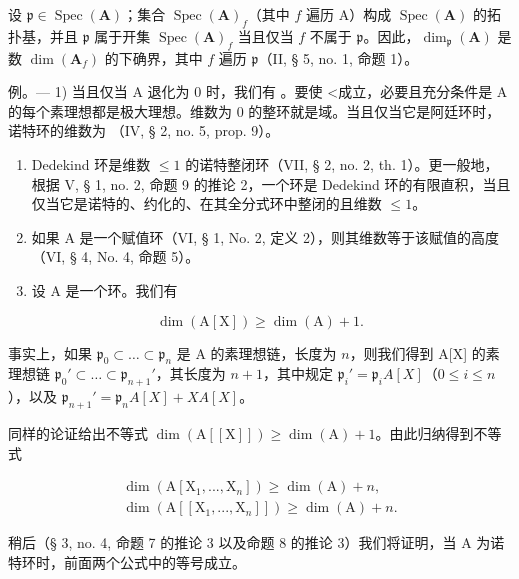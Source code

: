 设 \(\mathfrak{p} \in \operatorname{Spec}(\mathbf{A})\)；集合 \(\operatorname{Spec}(\mathbf{A})_f\)（其中 \(f\) 遍历 A）构成 \(\operatorname{Spec}(\mathbf{A})\) 的拓扑基，并且 \(\mathfrak{p}\) 属于开集 \(\operatorname{Spec}(\mathbf{A})_f\) 当且仅当 \(f\) 不属于 \(\mathfrak{p}\)。因此，\(\dim_{\mathfrak{p}}(\mathbf{A})\) 是数 \(\dim(\mathbf{A}_f)\) 的下确界，其中 \(f\) 遍历 \(\mathfrak{p}\)（II, § 5, no. 1, 命题 1）。

例。--- 1) 当且仅当 A 退化为 0 时，我们有  。要使 \textless 成立，必要且充分条件是 A 的每个素理想都是极大理想。维数为 0 的整环就是域。当且仅当它是阿廷环时，诺特环的维数为 {}（IV, § 2, no. 5, prop. 9）。

\begin{enumerate}
\def\labelenumi{\arabic{enumi})}
\setcounter{enumi}{1}
\item
Dedekind 环是维数 \(\leqslant 1\) 的诺特整闭环（VII, § 2, no. 2, th. 1）。更一般地，根据 V, § 1, no. 2, 命题 9 的推论 2，一个环是 Dedekind 环的有限直积，当且仅当它是诺特的、约化的、在其全分式环中整闭的且维数 \(\leqslant 1\)。
\item
如果 A 是一个赋值环（VI, § 1, No. 2, 定义 2），则其维数等于该赋值的高度（VI, § 4, No. 4, 命题 5）。
\item
设 A 是一个环。我们有
\end{enumerate}

\[
\dim (\mathrm{A} [ \mathrm{X} ]) \geqslant \dim (\mathrm{A}) + 1.
\]

事实上，如果 \(\mathfrak{p}_0 \subset \ldots \subset \mathfrak{p}_n\) 是 A 的素理想链，长度为 \(n\)，则我们得到 A[X] 的素理想链 \(\mathfrak{p}_0' \subset \ldots \subset \mathfrak{p}_{n+1}'\){}{}，其长度为 \(n+1\)，其中规定 \(\mathfrak{p}_i' = \mathfrak{p}_iA[X]\)（\(0 \leqslant i \leqslant n\)），以及 \(\mathfrak{p}_{n+1}' = \mathfrak{p}_nA[X] + XA[X]\)。

同样的论证给出不等式 \(\dim(\mathrm{A}[[\mathrm{X}]]) \geqslant \dim(\mathrm{A}) + 1\)。由此归纳得到不等式

\[
\begin{array}{l} \dim (\mathrm{A} [ \mathrm{X} _ {1},..., \mathrm{X} _ {n} ]) \geqslant \dim (\mathrm{A}) + n, \\ \dim (\mathrm{A} [ [ \mathrm{X} _ {1},..., \mathrm{X} _ {n} ] ]) \geqslant \dim (\mathrm{A}) + n. \end{array}
\]

稍后（§ 3, no. 4, 命题 7 的推论 3 以及命题 8 的推论 3）我们将证明，当 A 为诺特环时，前面两个公式中的等号成立。

